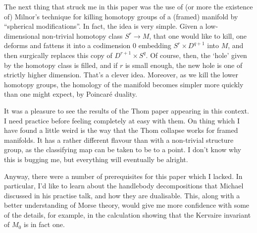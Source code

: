\documentclass[11pt]{article}
\begin{document}
\begin{Kervaire NoDifferentiableStructure}
The next thing that struck me in this paper was the use of (or more the existence of) Milnor's technique for killing homotopy groups of a (framed) manifold by ``spherical modifications''. In fact, the idea is very simple. Given a low-dimensional non-trivial homotopy class $S^r\to M$, that one would like to kill, one deforms and fattens it into a codimension 0 embedding $S^r\times D^{q+1}$ into $M$, and then surgically replaces this copy of $D^{r+1}\times S^{q}$. Of course, then, the `hole' given by the homotopy class is filled, and if $r$ is small enough, the new hole is one of strictly higher dimension. That's a clever idea. Moreover, as we kill the lower homotopy groups, the homology of the manifold becomes simpler more quickly than one might expect, by Poincar\'e duality.

It was a pleasure to see the results of the Thom paper appearing in this context. I need practice before feeling completely at easy with them. On thing which I have found a little weird is the way that the Thom collapse works for framed manifolds. It has a rather different flavour than with a non-trivial structure group, as the classifying map can be taken to be to a point. I don't know why this is bugging me, but everything will eventually be alright.

Anyway, there were a number of prerequisites for this paper which I lacked. In particular, I'd like to learn about the handlebody decompositions that Michael discussed in his practise talk, and how they are dualisable. This, along with a better understanding of Morse theory, would give me more confidence with some of the details, for example, in the calculation showing that the Kervaire invariant of $M_0$ is in fact one.

\pagebreak
\end{Kervaire NoDifferentiableStructure}
\end{document}
